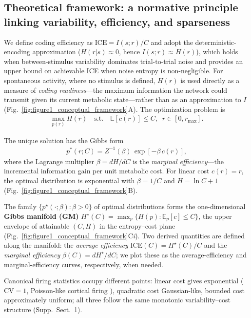 \subsection{Theoretical framework: a normative principle linking variability, efficiency, and sparseness}

We define coding efficiency as $\mathrm{ICE} = I(s;r)/C$ and adopt the deterministic-encoding approximation ($H(r|s)\approx 0$, hence $I(s;r)\approx H(r)$), which holds when between-stimulus variability dominates trial-to-trial noise and provides an upper bound on achievable ICE when noise entropy is non-negligible.  For spontaneous activity, where no stimulus is defined, $H(r)$ is used directly as a measure of \emph{coding readiness}---the maximum information the network could transmit given its current metabolic state---rather than as an approximation to $I$ (Fig.~\ref{fig:figure1_conceptual_framework}A).  The optimization problem is
\begin{align}
\max_{p(r)} H(r)
\quad \text{s.t.}\quad
\mathbb{E}[c(r)] \le C,\;\; r\!\in[0,r_{\max}].
\label{eq:normative}
\end{align}

The unique solution has the Gibbs form
\begin{align}
p^*(r;C) = Z^{-1}(\beta)\,\exp[-\beta\,c(r)],
\label{eq:gibbs}
\end{align}
where the Lagrange multiplier $\beta = dH/dC$ is the \emph{marginal efficiency}---the incremental information gain per unit metabolic cost.  For linear cost $c(r)=r$, the optimal distribution is exponential with $\beta = 1/C$ and $H = \ln C + 1$ (Fig.~\ref{fig:figure1_conceptual_framework}B).

The family $\{p^{\star}(\cdot;\beta):\beta>0\}$ of optimal distributions forms the one-dimensional \textbf{Gibbs manifold (GM)} $H^\star(C)=\max_{p}\{H(p):\mathbb{E}_p[c]\le C\}$, the upper envelope of attainable $(C,H)$ in the entropy--cost plane (Fig.~\ref{fig:figure1_conceptual_framework}C\textit{i}).  Two derived quantities are defined along the manifold: the \emph{average efficiency} $\mathrm{ICE}(C)=H^\star(C)/C$ and the \emph{marginal efficiency} $\beta(C)=dH^\star/dC$; we plot these as the average-efficiency and marginal-efficiency curves, respectively, when needed.

Canonical firing statistics occupy different points: linear cost gives exponential ($\mathrm{CV}=1$, Poisson-like cortical firing \cite{4,5}), quadratic cost Gaussian-like, bounded cost approximately uniform; all three follow the same monotonic variability--cost structure (Supp.~Sect.~1).

